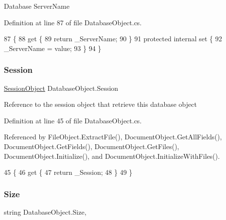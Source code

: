 Database Server\+Name 



Definition at line 87 of file Database\+Object.\+cs.


\begin{DoxyCode}
87                              \{
88         \textcolor{keyword}{get} \{
89             \textcolor{keywordflow}{return} \_ServerName;
90         \}
91         \textcolor{keyword}{protected} \textcolor{keyword}{internal} \textcolor{keyword}{set} \{
92             \_ServerName = value;
93         \}
94     \}
\end{DoxyCode}
\mbox{\label{class_database_object_aa8484162b7d2a7c4c9426bca13c64c07}} 
\subsubsection{\texorpdfstring{Session}{Session}}
{\footnotesize\ttfamily \mbox{\hyperlink{class_session_object}{Session\+Object}} Database\+Object.\+Session\hspace{0.3cm}{\ttfamily [get]}}



Reference to the session object that retrieve this database object 



Definition at line 45 of file Database\+Object.\+cs.



Referenced by File\+Object.\+Extract\+File(), Document\+Object.\+Get\+All\+Fields(), Document\+Object.\+Get\+Fields(), Document\+Object.\+Get\+Files(), Document\+Object.\+Initialize(), and Document\+Object.\+Initialize\+With\+Files().


\begin{DoxyCode}
45                                  \{
46         \textcolor{keyword}{get} \{
47             \textcolor{keywordflow}{return} \_Session;
48         \}
49     \}
\end{DoxyCode}
\mbox{\label{class_database_object_ad86f5dd95a9debdef284e21e32936e9e}} 
\subsubsection{\texorpdfstring{Size}{Size}}
{\footnotesize\ttfamily string Database\+Object.\+Size\hspace{0.3cm}{\ttfamily [get]}, {\ttfamily [set]}}



